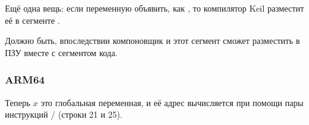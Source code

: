 \myindex{\ROM}
Ещё одна вещь: если переменную объявить, как , то компилятор Keil разместит её в сегменте .

Должно быть, впоследствии компоновщик и этот сегмент сможет разместить в ПЗУ вместе с сегментом кода.

\subsubsection{ARM64}



Теперь $x$ это глобальная переменная, и её адрес вычисляется при помощи пары инструкций / (строки 21 и 25).

